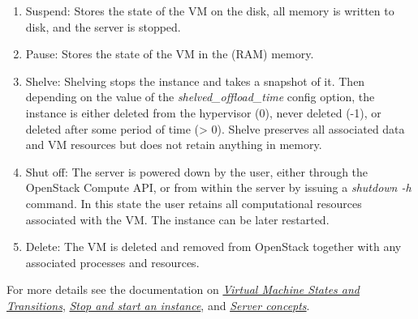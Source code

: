 \begin{enumerate}
\item Suspend: Stores the state of the VM on the disk, all memory is written to disk, and the server is stopped.
\item Pause: Stores the state of the VM in the (RAM) memory.
\item Shelve: Shelving stops the instance and takes a snapshot of it. Then depending on the value of the \emph{shelved\_offload\_time} config option, the instance is either deleted from the hypervisor (0), never deleted (-1), or deleted after some period of time (> 0). Shelve preserves all associated data and VM resources but does not retain anything in memory.
\item Shut off: The server is powered down by the user, either through the OpenStack Compute API, or from within the server by issuing a \emph{shutdown -h} command. In this state the user retains all computational resources associated with the VM. The instance can be later restarted.
\item Delete: The VM is deleted and removed from \gls{OpenStack} together with any associated processes and resources.
\end{enumerate}

For more details see the documentation on \href{https://docs.openstack.org/nova/pike/reference/vm-states.html}{\emph{Virtual Machine States and Transitions}}, \href{https://docs.openstack.org/mitaka/user-guide/cli_stop_and_start_an_instance.html}{\emph{Stop and start an instance}},
and \href{https://developer.openstack.org/api-guide/compute/server_concepts.html}{\emph{Server concepts}}.

